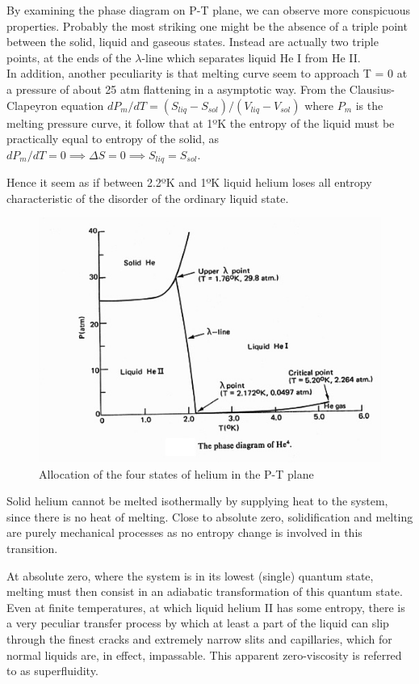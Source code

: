 \documentclass{article}
\begin{document}
By examining the phase diagram on P-T plane, we can observe more conspicuous properties. Probably the most striking one might be the absence of a triple point between the solid, liquid and gaseous states. Instead are actually two triple points, at the ends of the $\lambda$-line which separates liquid He I from He II\@.
\\

In addition, another peculiarity is that melting curve seem to approach T = 0 at a pressure of about 25 atm flattening in a asymptotic way. From the Clausius-Clapeyron equation $dP_m / dT =(S_{liq}-S_{sol})/(V_{liq}-V_{sol})$ where $P_m$ is the melting pressure curve, it follow that at 1ºK the entropy of the liquid must be practically equal to entropy of the solid, as $dP_m / dT = 0 \implies \Delta S = 0 \implies S_{liq}=S_{sol}$.

Hence it seem as if between 2.2ºK and 1ºK liquid helium loses all entropy characteristic of the disorder of the ordinary liquid state.
\\

\begin{figure}[H]
    \centering
    \includegraphics[width=0.75\linewidth]{Images/PhaseDiagr.png}
    \caption{Allocation of the four states of helium in the P-T plane}
    \label{fig:enter-label}
\end{figure}

Solid helium cannot be melted isothermally by supplying heat to the system, since there is no heat of melting. Close to absolute zero, solidification and melting are purely mechanical processes as no entropy change is involved in this transition.

At absolute zero, where the system is in its lowest (single) quantum state, melting must then consist in an adiabatic transformation of this quantum state. Even at finite temperatures, at which liquid helium II has some entropy, there is a very peculiar transfer process by which at least a part of the liquid can slip through the finest cracks and extremely narrow slits and capillaries, which for normal liquids are, in effect, impassable. This apparent zero-viscosity is referred to as superfluidity.
\\
\end{document}
